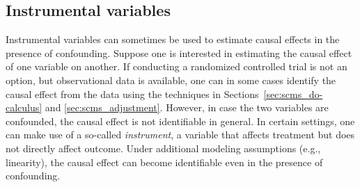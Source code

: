 \subsection{Instrumental variables}

Instrumental variables can sometimes be used to estimate causal effects in the presence of confounding.
Suppose one is interested in estimating the causal effect of one variable on another. If conducting a randomized
controlled trial is not an option, but observational data is available, one can in some cases identify the 
causal effect from the data using the techniques in Sections~\ref{sec:scms_do-calculus} and \ref{sec:scms_adjustment}.
However, in case the two variables are confounded, the causal effect is not identifiable in general.
In certain settings, one can make use of a so-called \emph{instrument}, a variable that affects treatment but does not
directly affect outcome. Under additional modeling assumptions (e.g., linearity), the causal effect can become
identifiable even in the presence of confounding.

